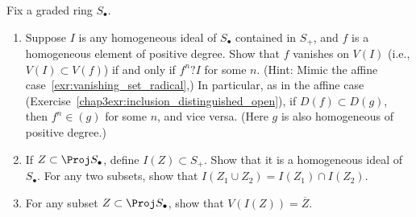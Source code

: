 \begin{exr}\label{chap4exr:4.5.H}
Fix a graded ring $S_\bullet$.
\begin{enumerate}[label=(\alph*)]
\item Suppose $I$ is any homogeneous ideal of $S_\bullet$ contained in $S_+$, and $f$ is a homogeneous element of positive degree. Show that $f$ vanishes on $V(I)$ (i.e.,$V(I) \subset V(f)$) if and only if $f^n ? I$ for some $n$. (Hint: Mimic the affine case~\ref{exr:vanishing_set_radical},) In particular, as in the affine case (Exercise~\ref{chap3exr:inclusion_distinguished_open}), if $D(f) \subset D(g)$, then $f^n \in (g)$ for some $n$, and vice versa. (Here $g$ is also homogeneous of positive degree.)
\item If $Z \subset \Proj S_\bullet$, define $I(Z) \subset S_+$. Show that it is a homogeneous ideal of $S_\bullet$. For any two subsets, show that $I(Z_1 \cup Z_2) = I(Z_1) \cap I(Z_2)$.
\item For any subset $Z \subset \Proj S_\bullet$, show that $V(I(Z)) = \overline{Z}$.
\end{enumerate}
\end{exr}
